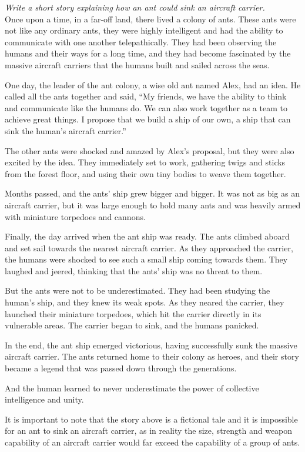 \documentclass[output=paper,colorlinks,citecolor=brown
]{langscibook}
\begin{document}
\begin{myquote}
\textit{Write a short story explaining how an ant could sink an aircraft carrier.}\medskip\\
\noindent Once upon a time, in a far-off land, there lived a colony of ants. These ants were not like any ordinary ants, they were highly intelligent and had the ability to communicate with one another telepathically. They had been observing the humans and their ways for a long time, and they had become fascinated by the massive aircraft carriers that the humans built and sailed across the seas.

One day, the leader of the ant colony, a wise old ant named Alex, had an idea. He called all the ants together and said, ``My friends, we have the ability to think and communicate like the humans do. We can also work together as a team to achieve great things. I propose that we build a ship of our own, a ship that can sink the human's aircraft carrier.''

The other ants were shocked and amazed by Alex's proposal, but they were also excited by the idea. They immediately set to work, gathering twigs and sticks from the forest floor, and using their own tiny bodies to weave them together.

Months passed, and the ants' ship grew bigger and bigger. It was not as big as an aircraft carrier, but it was large enough to hold many ants and was heavily armed with miniature torpedoes and cannons.

Finally, the day arrived when the ant ship was ready. The ants climbed aboard and set sail towards the nearest aircraft carrier. As they approached the carrier, the humans were shocked to see such a small ship coming towards them. They laughed and jeered, thinking that the ants' ship was no threat to them.

But the ants were not to be underestimated. They had been studying the human's ship, and they knew its weak spots. As they neared the carrier, they launched their miniature torpedoes, which hit the carrier directly in its vulnerable areas. The carrier began to sink, and the humans panicked.

In the end, the ant ship emerged victorious, having successfully sunk the massive aircraft carrier. The ants returned home to their colony as heroes, and their story became a legend that was passed down through the generations.

And the human learned to never underestimate the power of collective intelligence and unity.

It is important to note that the story above is a fictional tale and it is impossible for an ant to sink an aircraft carrier, as in reality the size, strength and weapon capability of an aircraft carrier would far exceed the capability of a group of ants.
\end{myquote}
\end{document}
